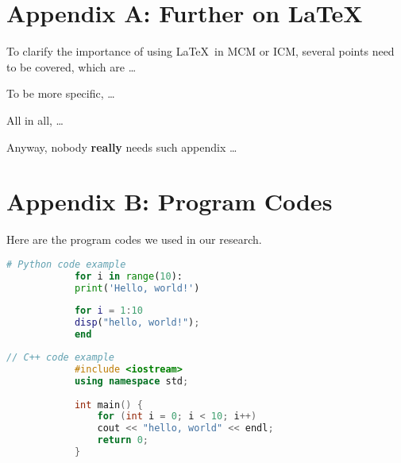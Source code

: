 \documentclass[12pt]{article}  %
\begin{document}
	
	\begin{subappendices}  %
		
		\section{Appendix A: Further on \LaTeX}
		To clarify the importance of using \LaTeX\ in MCM or ICM, several points need to be covered, which are \ldots
		
		To be more specific, \ldots
		
		All in all, \ldots
		
		Anyway, nobody \textbf{really} needs such appendix \ldots
		
		\section{Appendix B: Program Codes}
		Here are the program codes we used in our research.
		
		
		\begin{lstlisting}[language=Python, name={test.py}]
			# Python code example
			for i in range(10):
			print('Hello, world!')
		\end{lstlisting}
		
		\begin{lstlisting}[language=MATLAB, name={test.m}]
			% MATLAB code example
			for i = 1:10
			disp("hello, world!");
			end
		\end{lstlisting}
		
		\begin{lstlisting}[language=C++, name={test.cpp}]
			// C++ code example
			#include <iostream>
			using namespace std;
			
			int main() {
				for (int i = 0; i < 10; i++)
				cout << "hello, world" << endl;
				return 0;
			}
		\end{lstlisting}
		
	\end{subappendices}  %
	
\end{document}
